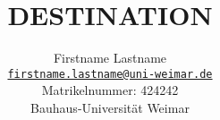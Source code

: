 \documentclass[a4paper]{article}
\theoremstyle{definition}
\theoremstyle{remark}
\begin{document}

\title{\textbf{%
    {{DESTINATION}}
}}

\author{Firstname Lastname\\
  \normalsize \href{mailto:firstname.lastname@uni-weimar.de}
    {\nolinkurl{firstname.lastname@uni-weimar.de}} \\
  \normalsize Matrikelnummer: 424242\\
  \vspace{3mm}
  \normalsize Bauhaus-Universit\"at Weimar\\
}


\maketitle


\lipsum[1-10]

%
%
\end{document}
